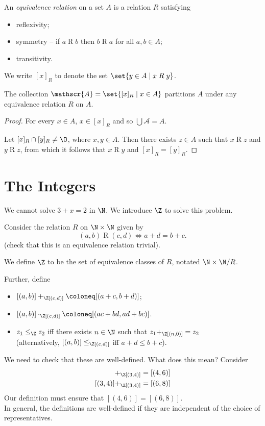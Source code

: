 \begin{definition}[Equivalence] \label{def:relations:equivalence}
    An \emph{equivalence relation} on a set $A$ is a relation $R$ satisfying
    \begin{itemize}
        \item reflexivity;
        \item symmetry -- if $a \mathrel{R} b$ then $b \mathrel{R} a$ for all
        $a, b \in A$;
        \item transitivity.
    \end{itemize}
\end{definition}
\begin{notation}
    We write $[x]_R$ to denote the set $\set{y \in A \mid x \mathrel{R} y}$.
\end{notation}
\begin{proposition}
    The collection $\mathscr{A} = \set{[x]_R \mid x \in A}$ partitions $A$
    under any equivalence relation $R$ on $A$.
\end{proposition}
\begin{proof}
    For every $x \in A$, $x \in [x]_R$ and so $\bigcup \mathscr{A} = A$.

    Let $[x]_R \cap [y]_R \ne \O$, where $x, y \in A$.
    Then there exists $z \in A$ such that $x \mathrel{R} z$ and
    $y \mathrel{R} z$, from which it follows that $x \mathrel{R} y$ and
    $[x]_R = [y]_R$.
\end{proof}

\section{The Integers} \label{sec:integers}
We cannot solve $3 + x = 2$ in $\N$.
We introduce $\Z$ to solve this problem.

Consider the relation $R$ on $\N \times \N$ given by \[
    (a, b) \mathrel{R} (c, d) \iff a + d = b + c.
\] (check that this is an equivalence relation \textcolor{solved}{trivial}).
\begin{definition} \label{def:integers}
    We define $\Z$ to be the set of equivalence classes of $R$, notated
    $\N \times \N / R$.
\end{definition}
Further, define
\begin{itemize}
    \item $[(a, b)] +_\Z [(c, d)] \coloneq [(a + c, b + d)]$;
    \item $[(a, b)] \cdot_\Z [(c, d)] \coloneq [(ac + bd, ad + bc)]$.
    \item $z_1 \le_\Z z_2$ iff there exists $n \in \N$ such that
    $z_1 +_\Z [(n, 0)] = z_2$ \\
    (alternatively, $[(a, b)] \le_\Z [(c, d)]$ iff $a + d \le b + c$).
\end{itemize}
We need to check that these are well-defined.
What does this mean?
Consider \begin{align*}
    [(1, 2)] +_\Z [(3, 4)] &= [(4, 6)] \\
    [(3, 4)] +_\Z [(3, 4)] &= [(6, 8)]
\end{align*}
Our definition must ensure that $[(4, 6)] = [(6, 8)]$. \\
In general, the definitions are well-defined if they are independent of the
choice of representatives.
